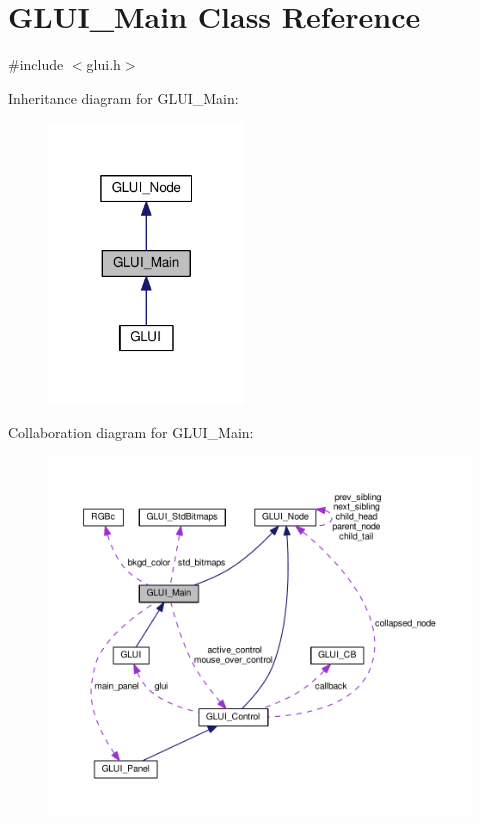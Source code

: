 \hypertarget{class_g_l_u_i___main}{\section{G\+L\+U\+I\+\_\+\+Main Class Reference}
\label{class_g_l_u_i___main}
}


{\ttfamily \#include $<$glui.\+h$>$}



Inheritance diagram for G\+L\+U\+I\+\_\+\+Main\+:\nopagebreak
\begin{figure}[H]
\begin{center}
\leavevmode
\includegraphics[width=148pt]{class_g_l_u_i___main__inherit__graph}
\end{center}
\end{figure}


Collaboration diagram for G\+L\+U\+I\+\_\+\+Main\+:\nopagebreak
\begin{figure}[H]
\begin{center}
\leavevmode
\includegraphics[width=350pt]{class_g_l_u_i___main__coll__graph}
\end{center}
\end{figure}

